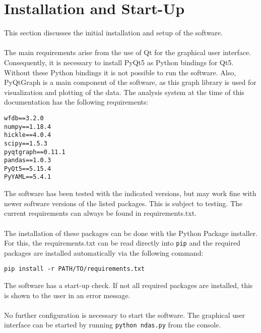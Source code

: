 
\chapter{Installation and Start-Up}
This section discusses the initial installation and setup of the software.\\
\\
The main requirements arise from the use of Qt for the graphical user interface. Consequently, it is necessary to install PyQt5 as Python bindings for Qt5. Without these Python bindings it is not possible to run the software. Also, PyQtGraph is a main component of the software, as this graph library is used for visualization and plotting of the data. The analysis system at the time of this documentation has the following requirements: 
\begin{lstlisting}[caption=requirements.txt: Current requirements for the analysis software.]
wfdb==3.2.0
numpy==1.18.4
hickle==4.0.4
scipy==1.5.3
pyqtgraph==0.11.1
pandas==1.0.3
PyQt5==5.15.4
PyYAML==5.4.1
\end{lstlisting}
The software has been tested with the indicated versions, but may work fine with newer software versions of the listed packages. This is subject to testing. The current requirements can always be found in requirements.txt.\\
\\
The installation of these packages can be done with the Python Package installer. For this, the requirements.txt can be read directly into \texttt{pip} and the required packages are installed automatically via the following command:
\begin{lstlisting}[caption=Installation of requirements from the requirements.txt.]
pip install -r PATH/TO/requirements.txt
\end{lstlisting}
The software has a start-up check. If not all required packages are installed, this is shown to the user in an error message.\\
\\
No further configuration is necessary to start the software. The graphical user interface can be started by running \texttt{python ndas.py} from the console.